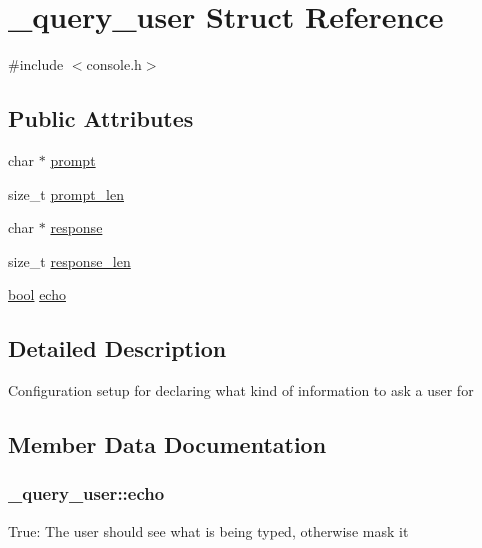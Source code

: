 \hypertarget{struct__query__user}{}\section{\+\_\+query\+\_\+user Struct Reference}
\label{struct__query__user}


{\ttfamily \#include $<$console.\+h$>$}

\subsection*{Public Attributes}
\begin{DoxyCompactItemize}
\item 
char $\ast$ \hyperlink{struct__query__user_a0d31c4f55f2bf9b3ea982a448492cc9b}{prompt}
\item 
size\+\_\+t \hyperlink{struct__query__user_a256a230796e573740fa100702526f123}{prompt\+\_\+len}
\item 
char $\ast$ \hyperlink{struct__query__user_adcb311b865e572b4f1fd10a9e33cd753}{response}
\item 
size\+\_\+t \hyperlink{struct__query__user_ab25afbb0907d98746eb46438accb7afb}{response\+\_\+len}
\item 
\hyperlink{automatic_8c_abb452686968e48b67397da5f97445f5b}{bool} \hyperlink{struct__query__user_aeb7652e27ca4f60624cae364d15c2b13}{echo}
\end{DoxyCompactItemize}


\subsection{Detailed Description}
Configuration setup for declaring what kind of information to ask a user for 

\subsection{Member Data Documentation}
\hypertarget{struct__query__user_aeb7652e27ca4f60624cae364d15c2b13}{}
\subsubsection[{echo}]{ \+\_\+query\+\_\+user\+::echo}\label{struct__query__user_aeb7652e27ca4f60624cae364d15c2b13}
True\+: The user should see what is being typed, otherwise mask it \hypertarget{struct__query__user_a0d31c4f55f2bf9b3ea982a448492cc9b}{}
